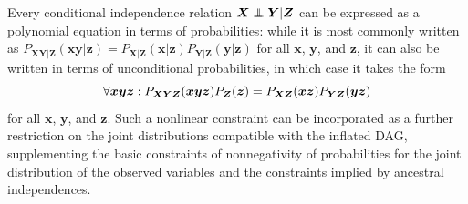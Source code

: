 {%


Every conditional independence relation $\bm{X}\indep\bm{Y}|\bm{Z}$ can be expressed as a polynomial equation in terms of probabilities: while it is most commonly written as $P_{\bm{X}\bm{Y}|\bm{Z}}(\bm{x}\bm{y}|\bm{z})=P_{\bm{X}|\bm{Z}}(\bm{x}|\bm{z})P_{\bm{Y}|\bm{Z}}(\bm{y}|\bm{z})$ for all $\bm{x}$, $\bm{y}$, and $\bm{z}$, it can also be written in terms of unconditional probabilities, in which case it takes the form
\[
\forall{\bm{x} \bm{y} \bm{z}}: \p[\bm{X}\bm{Y}\bm{Z}]{\bm{x}\bm{y}\bm{z}}\p[\bm{Z}]{\bm{z}}=\p[\bm{X}\bm{Z}]{\bm{x}\bm{z}}\p[\bm{Y}\bm{Z}]{\bm{y}\bm{z}}
\]
for all $\bm{x}$, $\bm{y}$, and $\bm{z}$. Such a nonlinear constraint can be incorporated as a further restriction on the joint distributions compatible with the inflated DAG, supplementing the basic constraints of nonnegativity of probabilities for the joint distribution of the observed variables and the constraints implied by ancestral independences.

}
